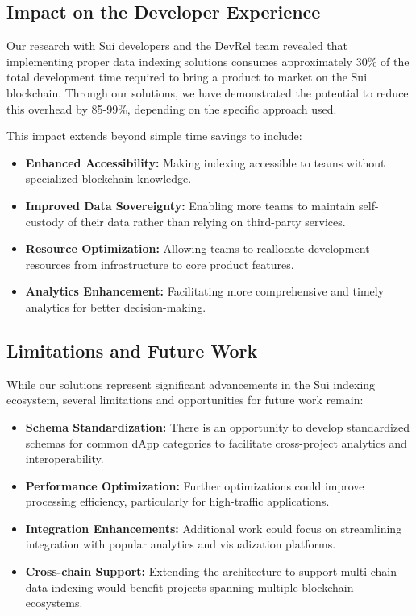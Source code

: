 \subsection{Impact on the Developer Experience}

Our research with Sui developers and the DevRel team revealed that implementing proper data indexing solutions consumes approximately 30\% of the total development time required to bring a product to market on the Sui blockchain. Through our solutions, we have demonstrated the potential to reduce this overhead by 85-99\%, depending on the specific approach used.

This impact extends beyond simple time savings to include:

\begin{itemize}
    \item \textbf{Enhanced Accessibility:} Making indexing accessible to teams without specialized blockchain knowledge.
    
    \item \textbf{Improved Data Sovereignty:} Enabling more teams to maintain self-custody of their data rather than relying on third-party services.
    
    \item \textbf{Resource Optimization:} Allowing teams to reallocate development resources from infrastructure to core product features.
    
    \item \textbf{Analytics Enhancement:} Facilitating more comprehensive and timely analytics for better decision-making.
\end{itemize}

\subsection{Limitations and Future Work}

While our solutions represent significant advancements in the Sui indexing ecosystem, several limitations and opportunities for future work remain:

\begin{itemize}
    \item \textbf{Schema Standardization:} There is an opportunity to develop standardized schemas for common dApp categories to facilitate cross-project analytics and interoperability.
    
    \item \textbf{Performance Optimization:} Further optimizations could improve processing efficiency, particularly for high-traffic applications.
    
    \item \textbf{Integration Enhancements:} Additional work could focus on streamlining integration with popular analytics and visualization platforms.
    
    \item \textbf{Cross-chain Support:} Extending the architecture to support multi-chain data indexing would benefit projects spanning multiple blockchain ecosystems.
\end{itemize}

